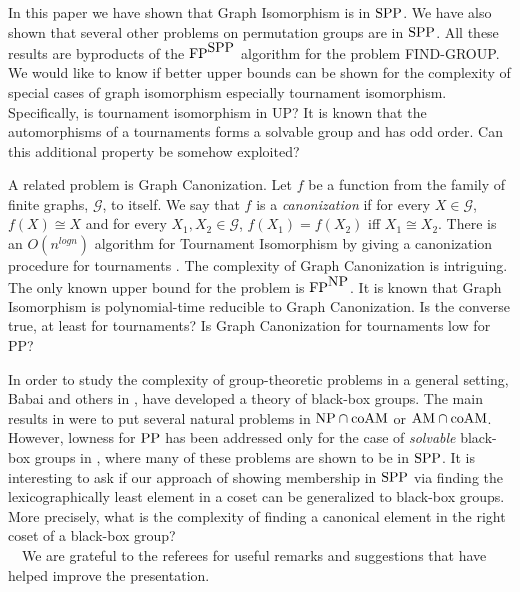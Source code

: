 \documentclass{elsart}
\newcommand{\PP}{\mbox{\rm PP}}
\newcommand{\NP}{\mbox{\rm NP}}
\newcommand{\FP}{\mbox{\rm FP}}
\newcommand{\SPP}{\mbox{\rm SPP}}
\newcommand{\AM}{\mbox{\rm AM}}
\newcommand{\coAM}{\mbox{\rm coAM}}
\begin{document}
In this paper we have shown that Graph Isomorphism is in $\SPP$. We
have also shown that several other problems on permutation groups are
in $\SPP$. All these results are byproducts of the $\FP^{\SPP}$
algorithm for the problem FIND-GROUP. We would like to know if better
upper bounds can be shown for the complexity of special cases of graph
isomorphism especially tournament isomorphism. Specifically, is
tournament isomorphism in UP? It is known that the automorphisms of a
tournaments forms a solvable group and has odd order. Can this
additional property be somehow exploited?

A related problem is Graph Canonization. Let $f$ be a function from
the family of finite graphs, $\mathcal{G}$, to itself. We say that $f$
is a \emph{canonization} if for every $X \in \mathcal{G}$, $f(X) \cong
X$ and for every $X_1,X_2 \in \mathcal{G}$, $f(X_1) = f(X_2)$ iff $X_1
\cong X_2$. There is an $O(n^{log n})$ algorithm for Tournament
Isomorphism by giving a canonization procedure for tournaments
\cite{babai83canonical}. The complexity of Graph Canonization is
intriguing. The only known upper bound for the problem is $\FP^{\NP}$.
It is known that Graph Isomorphism is polynomial-time reducible to
Graph Canonization. Is the converse true, at least for tournaments? Is
Graph Canonization for tournaments low for PP?

In order to study the complexity of group-theoretic problems in a
general setting, Babai and others in
\cite{babai85matrix,babai88arthur,babai92bounded}, have developed a
theory of black-box groups. The main results in
\cite{babai85matrix,babai88arthur,babai92bounded} were to put several
natural problems in $\NP\cap\coAM$ or $\AM\cap\coAM$. However, lowness
for $\PP$ has been addressed only for the case of \emph{solvable}
black-box groups in \cite{arvind97solvable,vinodchandran97improved},
where many of these problems are shown to be in $\SPP$. It is
interesting to ask if our approach of showing membership in $\SPP$ via
finding the lexicographically least element in a coset can be
generalized to black-box groups. More precisely, what is the
complexity of finding a
canonical element in the right coset of a black-box group?\\

~~We are grateful to the referees for
useful remarks and suggestions that have helped improve the
presentation.



\end{document}
